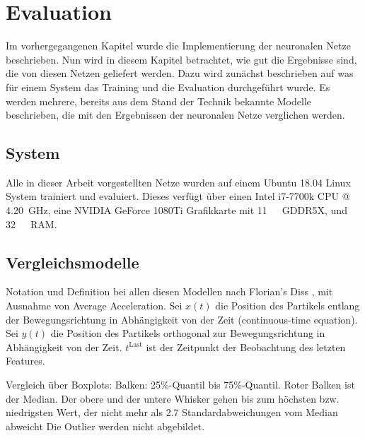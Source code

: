 \chapter{Evaluation}
\label{cap:Eval}

Im vorhergegangenen Kapitel wurde die Implementierung der neuronalen Netze beschrieben.
Nun wird in diesem Kapitel betrachtet, wie gut die Ergebnisse sind, die von diesen Netzen geliefert werden.
Dazu wird zunächst beschrieben auf was für einem System das Training und die Evaluation durchgeführt wurde.
Es werden mehrere, bereits aus dem Stand der Technik bekannte Modelle beschrieben, die mit den Ergebnissen der neuronalen Netze 
verglichen werden.

\section{System}

Alle in dieser Arbeit vorgestellten Netze wurden auf einem Ubuntu 18.04 Linux System trainiert und evaluiert.
Dieses verfügt über einen Intel i7-7700k CPU @ \SI{4.20}{\giga\hertz}, eine NVIDIA GeForce 1080Ti Grafikkarte mit \SI{11}{\giga\byte}~GDDR5X,
und \SI{32}{\giga\byte}~RAM. 


\section{Vergleichsmodelle}

\color{blue}
Notation und Definition bei allen diesen Modellen nach Florian's Diss \cite{Pfaff2018}, mit Ausnahme von Average Acceleration.
Sei \(x(t)\) die Position des Partikels entlang der Bewegungsrichtung in Abhängigkeit von der Zeit
(continuous-time equation).
Sei \( y(t)\) die Position des Partikels orthogonal zur Bewegungsrichtung in Abhängigkeit von der Zeit.
\(t^{\text{Last}}\) ist der Zeitpunkt der Beobachtung des letzten Features.

Vergleich über Boxplots: Balken: 25\%-Quantil bis 75\%-Quantil.
Roter Balken ist der Median. Der obere und der untere Whisker 
gehen bis zum höchsten bzw. niedrigsten Wert, der nicht mehr als 2.7 Standardabweichungen vom Median abweicht
Die Outlier werden nicht abgebildet.

\color{black}


